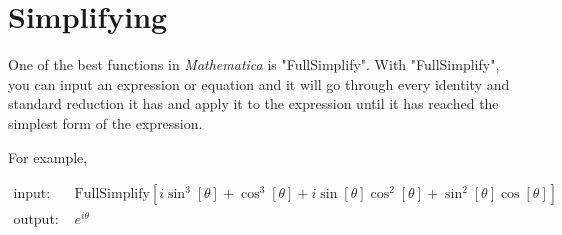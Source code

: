 \documentclass[11pt,a4paper,twoside]{article}
\begin{document}
\begin{itemize}
%						
%				
%						
%						
%						
%						
%						
%						
						
				\end{itemize}
				
		\section{Simplifying}
						
			One of the best functions in \textit{Mathematica} is "FullSimplify".  With "FullSimplify", you can input an expression or equation and it will go through every identity and standard reduction it has and apply it to the expression until it has reached the simplest form of the expression.
						
			For example,
						
			\begin{align*}
				\text{input: }& \text{FullSimplify}\left[i \sin ^3[\theta ]+\cos ^3[\theta ]+i \sin [\theta ] \cos ^2[\theta ]+\sin ^2[\theta ] \cos [\theta ]\right] \\
				\text{output: }& e^{ i \theta }
			\end{align*}
						
\end{document}
